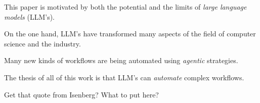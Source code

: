 \label{sec:contributions}

This paper is motivated by both the potential and the limits of {\em large language models} (LLM's).

On the one hand, LLM's have transformed many aspects of the field of computer science and the industry.

Many new kinds of workflows are being automated using {\em agentic} strategies.

The thesis of all of this work is that LLM's can {\em automate} complex workflows.

Get that quote from Isenberg? What to put here?

